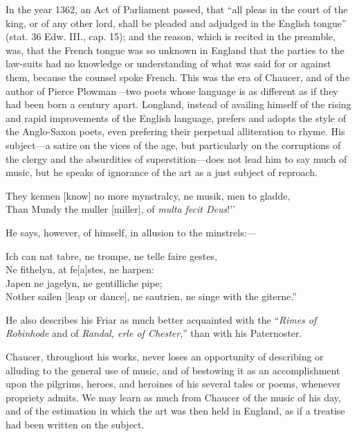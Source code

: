 In the year 1362, an Act of Parliament passed, that “all pleas in the court
of the king, or of any other lord, shall be pleaded and adjudged in the English
tongue” (stat. 36 Edw. III., cap. 15); and the reason, which is recited in the
preamble, was, that the French tongue was so unknown in England that the
parties to the law-suits had no knowledge or understanding of what was said for
or against them, because the counsel spoke French. This was the era of Chaucer,
and of the author of Pierce Plowman—two poets whose language is as different as
if they had been born a century apart. Longland, instead of availing himself of the
rising and rapid improvements of the English language, prefers and adopts the style
of the Anglo-Saxon poets, even prefering their perpetual alliteration to rhyme.
His subject—a satire on the vices of the age, but particularly on the corruptions
of the clergy and the absurdities of superstition—does not lead him to say much
of music, but he speaks of ignorance of the art as a just subject of reproach.
\settowidth{\versewidth}{“They kennen [know] no more mynstralcy, ne musik, men to gladde,}
\begin{scverse}
They kennen [know] no more mynstralcy, ne musik, men to gladde,\\
Than Mundy the muller [miller], of \textit{multa fecit Deus}!’’
\end{scverse}
\pagebreak
He says, however, of himself, in allusion to the minstrels:—

\settowidth{\versewidth}{Nother sailen [leap or dance], ne sautrien, ne singe with the giterne.”}
\begin{scverse}Ich can nat tabre, ne trompe, ne telle faire gestes,\\
Ne fithelyn, at fe[a]stes, ne harpen:\\
Japen ne jagelyn, ne gentilliche pipe;\\
Nother sailen [leap or dance], ne sautrien, ne singe with the giterne.”
\end{scverse}
He also describes his Friar as much better acquainted with the “\textit{Rimes of
Robinhode} and of \textit{Randal, erle of Chester},” than with his Paternoster.

Chaucer, throughout his works, never loses an opportunity of describing or
alluding to the general use of music, and of bestowing it as an accomplishment
upon the pilgrims, heroes, and heroines of his several tales or poems, whenever
propriety admits. We may learn as much from Chaucer of the music of his day,
and of the estimation in which the art was then held in England, as if a treatise
had been written on the subject.

